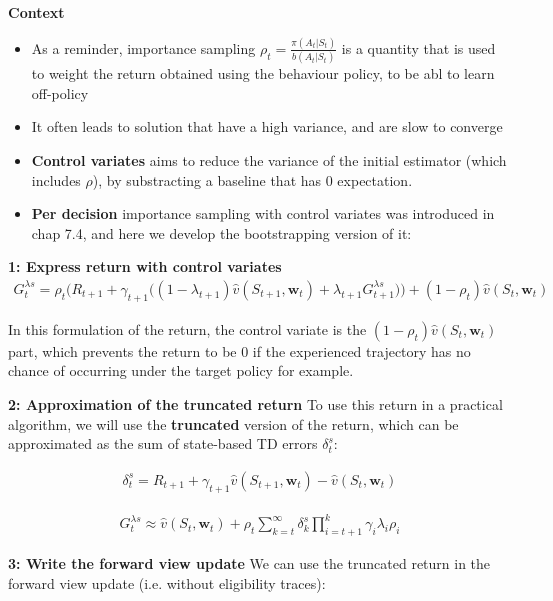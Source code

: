 \documentclass[sutton_barto_notes.tex]{subfiles}
\begin{document}
 \textbf{Context} 
\begin{itemize}
\item As a reminder, importance sampling $\rho_t = \frac{\pi(A_t|S_t)}{b(A_t|S_t)}$ is a quantity that is used to weight the return obtained using the behaviour policy, to be abl to learn off-policy 
\item It often leads to solution that have a high variance, and are slow to converge 
\item \textbf{Control variates} aims to reduce the variance of the initial estimator (which includes $\rho$), by substracting a baseline that has $0$ expectation. 
\item \textbf{Per decision} importance sampling with control variates was introduced in chap 7.4, and here we develop the bootstrapping version of it: 
\end{itemize}

 \textbf{1: Express return with control variates}
\begin{align}
G_t^{\lambda s} = \rho_t \Big( R_{t+1} + \gamma_{t+1} \big( (1 - \lambda_{t+1}) \hat{v}(S_{t+1}, \mathbf{w}_{t}) + \lambda_{t+1} G_{t+1}^{\lambda s}\big) \Big) + (1 - \rho_t) \hat{v}(S_{t}, \mathbf{w}_{t}) \label{eq:12.22}\tag{12.22}
\end{align} 

 In this formulation of the return, the control variate is the $(1 - \rho_t) \hat{v}(S_{t}, \mathbf{w}_{t})$ part, which prevents the return to be $0$ if the experienced trajectory has no chance of occurring under the target policy for example. 

 \textbf{2: Approximation of the truncated return} 
To use this return in a practical algorithm, we will use the \textbf{truncated} version of the return, which can be approximated as the sum of state-based TD errors $\delta_t^s$: 

\begin{align}
\delta_t^s = R_{t+1} + \gamma_{t+1} \hat{v}(S_{t+1}, \mathbf{w}_{t}) - \hat{v}(S_{t}, \mathbf{w}_{t}) \label{eq:12.23}\tag{12.23}
\end{align}

\begin{align}
G_t^{\lambda s} \approx \hat{v}(S_{t}, \mathbf{w}_{t}) + \rho_t \sum_{k=t}^{\infty} \delta_k^s \prod_{i=t+1}^k \gamma_i \lambda_i \rho_i \label{eq:12.24}\tag{12.24}
\end{align}

 \textbf{3: Write the forward view update}
We can use the truncated return in the forward view update (i.e. without eligibility traces): 
\end{document}
